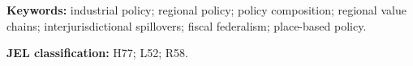 \noindent\textbf{Keywords:} industrial policy; regional policy; policy composition; regional value chains; interjurisdictional spillovers; fiscal federalism; place-based policy.

\medskip
\noindent\textbf{JEL classification:} H77; L52; R58.
